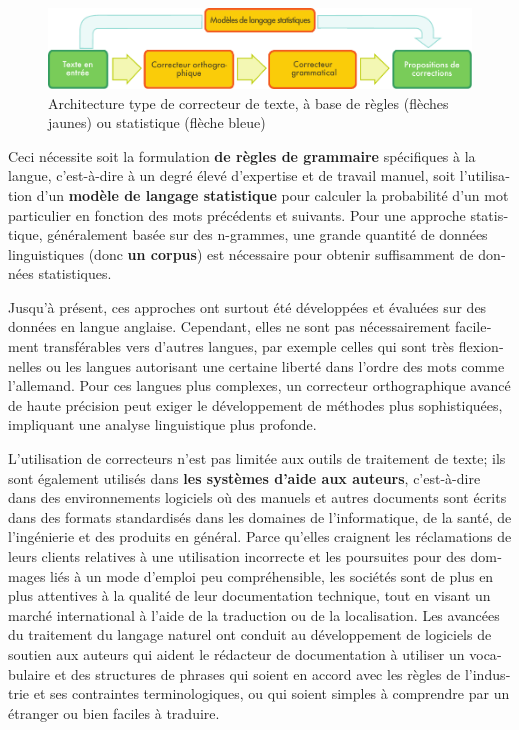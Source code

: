 \begin{french}
\begin{multicols}{2}
\begin{figure}[t]
\begin{center}
  \includegraphics[width=\textwidth]{../_media/french/language_checking.pdf}
\caption{Architecture type de correcteur de texte, à base de règles
  (flèches jaunes) ou statistique (flèche bleue)}
\label{fig:spellchecker}
\end{center}
\end{figure}

Ceci nécessite soit la formulation {\bf de règles
de grammaire} spécifiques à la langue, c'est-à-dire à un degré élevé d'expertise et de travail
manuel, soit l'utilisation d'un {\bf modèle de langage statistique} pour
calculer la probabilité d'un mot particulier en fonction des mots
précédents et suivants. Pour une approche statistique, généralement
basée sur des n-grammes, une grande quantité de données linguistiques
(donc {\bf un corpus}) est nécessaire pour obtenir suffisamment de données
statistiques.

Jusqu'à présent, ces approches ont surtout été développées et évaluées
sur des données en langue anglaise. Cependant, elles ne sont pas
nécessairement facilement transférables vers d'autres langues, par
exemple celles qui sont très flexionnelles ou les langues autorisant
une certaine liberté dans l'ordre des mots comme l'allemand. Pour ces langues
plus complexes, un correcteur orthographique avancé de haute précision
peut exiger le développement de méthodes plus sophistiquées,
impliquant une analyse linguistique plus profonde.

L'utilisation de correcteurs n'est pas limitée aux outils de
traitement de texte; ils sont également utilisés dans {\bf les systèmes
d'aide aux auteurs}, c'est-à-dire dans des environnements logiciels où
des manuels et autres documents sont écrits dans des formats
standardisés dans les domaines de l'informatique, de la santé, de
l'ingénierie et des produits en général. Parce qu'elles craignent les
réclamations de leurs clients relatives à une utilisation incorrecte
et les poursuites pour des dommages liés à un mode d'emploi peu
compréhensible, les sociétés sont de plus en plus attentives à la
qualité de leur documentation technique, tout en visant un marché
international à l'aide de la traduction ou de la localisation. Les
avancées du traitement du langage naturel ont conduit au développement
de logiciels de soutien aux auteurs qui aident le rédacteur de
documentation à utiliser un vocabulaire et des structures de phrases
qui soient en accord avec les règles de l'industrie et ses
contraintes terminologiques, ou qui soient simples à comprendre par un
étranger ou bien faciles à traduire.


\end{multicols}
\end{french}
